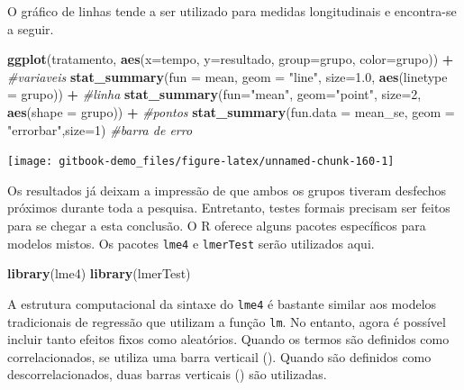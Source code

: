 \documentclass[
]{book}
\newenvironment{Shaded}{\begin{snugshade}}{\end{snugshade}}
\newcommand{\CommentTok}[1]{\textcolor[rgb]{0.56,0.35,0.01}{\textit{#1}}}
\newcommand{\DataTypeTok}[1]{\textcolor[rgb]{0.13,0.29,0.53}{#1}}
\newcommand{\DecValTok}[1]{\textcolor[rgb]{0.00,0.00,0.81}{#1}}
\newcommand{\FloatTok}[1]{\textcolor[rgb]{0.00,0.00,0.81}{#1}}
\newcommand{\KeywordTok}[1]{\textcolor[rgb]{0.13,0.29,0.53}{\textbf{#1}}}
\newcommand{\NormalTok}[1]{#1}
\newcommand{\OperatorTok}[1]{\textcolor[rgb]{0.81,0.36,0.00}{\textbf{#1}}}
\newcommand{\StringTok}[1]{\textcolor[rgb]{0.31,0.60,0.02}{#1}}
\begin{document}
O gráfico de linhas tende a ser utilizado para medidas longitudinais e
encontra-se a seguir.

\begin{Shaded}
\begin{Highlighting}[]
\KeywordTok{ggplot}\NormalTok{(tratamento, }\KeywordTok{aes}\NormalTok{(}\DataTypeTok{x=}\NormalTok{tempo, }\DataTypeTok{y=}\NormalTok{resultado, }\DataTypeTok{group=}\NormalTok{grupo, }\DataTypeTok{color=}\NormalTok{grupo)) }\OperatorTok{+}\StringTok{ }\CommentTok{#variaveis}
\StringTok{  }\KeywordTok{stat_summary}\NormalTok{(}\DataTypeTok{fun =}\NormalTok{ mean, }\DataTypeTok{geom =} \StringTok{"line"}\NormalTok{, }\DataTypeTok{size=}\FloatTok{1.0}\NormalTok{, }\KeywordTok{aes}\NormalTok{(}\DataTypeTok{linetype =}\NormalTok{ grupo)) }\OperatorTok{+}\StringTok{ }\CommentTok{#linha}
\StringTok{  }\KeywordTok{stat_summary}\NormalTok{(}\DataTypeTok{fun=}\StringTok{"mean"}\NormalTok{, }\DataTypeTok{geom=}\StringTok{"point"}\NormalTok{, }\DataTypeTok{size=}\DecValTok{2}\NormalTok{, }\KeywordTok{aes}\NormalTok{(}\DataTypeTok{shape =}\NormalTok{ grupo)) }\OperatorTok{+}\StringTok{ }\CommentTok{#pontos}
\StringTok{  }\KeywordTok{stat_summary}\NormalTok{(}\DataTypeTok{fun.data =}\NormalTok{ mean_se, }\DataTypeTok{geom =} \StringTok{"errorbar"}\NormalTok{,}\DataTypeTok{size=}\DecValTok{1}\NormalTok{) }\CommentTok{#barra de erro}
\end{Highlighting}
\end{Shaded}

\begin{center}\texttt{[image: gitbook-demo\_files/figure-latex/unnamed-chunk-160-1]} \end{center}

Os resultados já deixam a impressão de que ambos os grupos tiveram
desfechos próximos durante toda a pesquisa. Entretanto, testes formais
precisam ser feitos para se chegar a esta conclusão. O R oferece alguns
pacotes específicos para modelos mistos. Os pacotes \texttt{lme4} e
\texttt{lmerTest} serão utilizados aqui.

\begin{Shaded}
\begin{Highlighting}[]
\KeywordTok{library}\NormalTok{(lme4)}
\KeywordTok{library}\NormalTok{(lmerTest)}
\end{Highlighting}
\end{Shaded}

A estrutura computacional da sintaxe do \texttt{lme4} é bastante similar
aos modelos tradicionais de regressão que utilizam a função \texttt{lm}.
No entanto, agora é possível incluir tanto efeitos fixos como
aleatórios. Quando os termos são definidos como correlacionados, se
utiliza uma barra verticail (\textbar). Quando são definidos como
descorrelacionados, duas barras verticais (\textbar\textbar) são
utilizadas.
\end{document}
